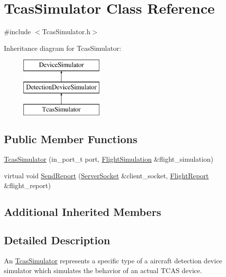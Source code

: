 \hypertarget{class_tcas_simulator}{}\section{Tcas\+Simulator Class Reference}
\label{class_tcas_simulator}


{\ttfamily \#include $<$Tcas\+Simulator.\+h$>$}

Inheritance diagram for Tcas\+Simulator\+:\begin{figure}[H]
\begin{center}
\leavevmode
\includegraphics[height=3.000000cm]{class_tcas_simulator}
\end{center}
\end{figure}
\subsection*{Public Member Functions}
\begin{DoxyCompactItemize}
\item 
\hyperlink{class_tcas_simulator_abf93f36c17d5b4bf977254909e0a1f9e}{Tcas\+Simulator} (in\+\_\+port\+\_\+t port, \hyperlink{class_flight_simulation}{Flight\+Simulation} \&flight\+\_\+simulation)
\item 
virtual void \hyperlink{class_tcas_simulator_afe6cb33e9dbb95da9953e291451aecdd}{Send\+Report} (\hyperlink{class_server_socket}{Server\+Socket} \&client\+\_\+socket, \hyperlink{class_flight_report}{Flight\+Report} \&flight\+\_\+report)
\end{DoxyCompactItemize}
\subsection*{Additional Inherited Members}


\subsection{Detailed Description}
An \hyperlink{class_tcas_simulator}{Tcas\+Simulator} represents a specific type of a aircraft detection device simulator which simulates the behavior of an actual T\+C\+A\+S device. 

